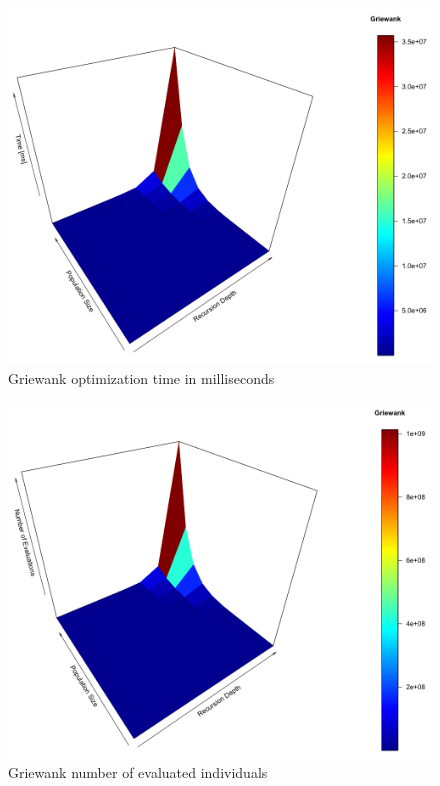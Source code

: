 \documentclass[graybox]{styles/svmult}
\begin{document}
\begin{figure}[b]
\sidecaption
\includegraphics[width=1.0\textwidth,height=0.45\textheight]{images/fig07}
\caption{Griewank optimization time in milliseconds}
\label{fig:14}
\end{figure}

\begin{figure}[b]
\sidecaption
\includegraphics[width=1.0\textwidth,height=0.45\textheight]{images/fig08}
\caption{Griewank number of evaluated individuals}
\label{fig:15}
\end{figure}
\end{document}
